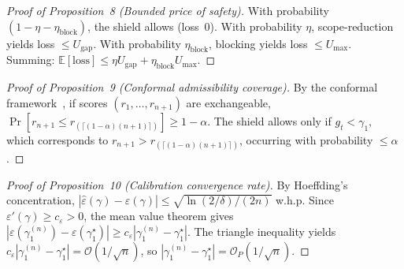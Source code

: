 \begin{proof}[Proof of Proposition~8 (Bounded price of safety)]
With probability $(1-\eta-\eta_{\mathrm{block}})$, the shield allows (loss~0).
With probability $\eta$, scope-reduction yields loss $\le U_{\mathrm{gap}}$.
With probability $\eta_{\mathrm{block}}$, blocking yields loss $\le U_{\max}$.
Summing: $\mathbb{E}[\text{loss}] \le \eta U_{\mathrm{gap}} + \eta_{\mathrm{block}} U_{\max}$.
\end{proof}

\begin{proof}[Proof of Proposition~9 (Conformal admissibility coverage)]
By the conformal framework~\cite{angelopoulos2023conformal}, if scores $(r_1,\ldots,r_{n+1})$ are exchangeable, $\Pr[r_{n+1} \le r_{(\lceil(1-\alpha)(n+1)\rceil)}] \ge 1-\alpha$.
The shield allows only if $g_t < \gamma_1$, which corresponds to $r_{n+1} > r_{(\lceil(1-\alpha)(n+1)\rceil)}$, occurring with probability $\le \alpha$.
\end{proof}

\begin{proof}[Proof of Proposition~10 (Calibration convergence rate)]
By Hoeffding's concentration, $|\hat\varepsilon(\gamma) - \varepsilon(\gamma)| \le \sqrt{\ln(2/\delta)/(2n)}$ w.h.p.
Since $\varepsilon'(\gamma) \ge c_\varepsilon > 0$, the mean value theorem gives $|\varepsilon(\gamma_1^{(n)}) - \varepsilon(\gamma_1^\star)| \ge c_\varepsilon |\gamma_1^{(n)} - \gamma_1^\star|$.
The triangle inequality yields $c_\varepsilon |\gamma_1^{(n)} - \gamma_1^\star| = \mathcal{O}(1/\sqrt{n})$, so $|\gamma_1^{(n)} - \gamma_1^\star| = \mathcal{O}_P(1/\sqrt{n})$.
\end{proof}

